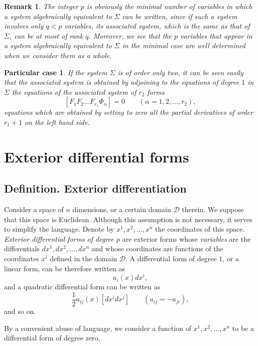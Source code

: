 \documentclass[leqno,11pt]{book}
\numberwithin{equation}{chapter}
\theoremstyle{shape1}
\theoremstyle{shape0}
\newtheorem*{rmk*}{\hspace{15pt}Remark}
\newtheorem*{pcase*}{\hspace{15pt}Particular case}
\theoremstyle{shape2}
\theoremstyle{definition}
\begin{document}
\begin{rmk*}
  The integer $p$ is obviously the minimal number of variables in which a system algebraically equivalent to $\Sigma$ can be written, since if such a system involves only $q<p$ variables, its associated system, which is the same as that of $\Sigma$, can be at most of rank $q$. Moreover, we see that the $p$ variables that appear in a system algebraically equivalent to $\Sigma$ in the minimal case are  well determined when we consider them as a whole.
\end{rmk*}

\begin{pcase*}
  If the system $\Sigma$ is of order only two, it can be seen easily that the associated system is obtained by adjoining to the equations of degree $1$ in $\Sigma$ the equations of the associated system of $r_{2}$ forms
\[
[F_{1}F_{2}\dots F_{r_{1}}\Phi_{\alpha}]=0\qquad(\alpha=1,2,\dots,r_{2}),
\]
equations which are obtained by setting to zero all the partial derivatives of order $r_{1}+1$ on the left hand side.
\end{pcase*}


\chapter{Exterior differential forms}
\label{cha:exter-diff-forms}

\section{Definition. Exterior differentiation}
\label{sec:defin-exter-diff}

\fsec Consider a space of $n$ dimensions, or a certain domain $\mathcal{D}$ therein. We suppose that this space is Euclidean. Although this assumption is not necessary, it serves  to simplify the language. Denote by $x^{1},x^{2},\dots,x^{n}$ the coordinates of this space.  \emph{Exterior differential forms of degree $p$} are exterior forms whose \emph{variables} are the differentials $dx^{1},dx^{2},\dots,dx^{n}$ and whose coordinates are functions of the coordinates $x^{i}$ defined in the domain $\mathcal{D}$. A differential form of degree $1$, or a linear form, can be therefore written as
\[
a_{i}(x)dx^{i},
\]
and a quadratic differential form can be written as
\[
\frac{1}{2}a_{ij}(x)[dx^{i}dx^{j}]\qquad(a_{ij}=-a_{ji}),
\]
and so on.

By a convenient abuse of language, we consider a function of $x^{1},x^{2},\dots,x^{n}$ to be a differential form of degree zero.
\end{document}
